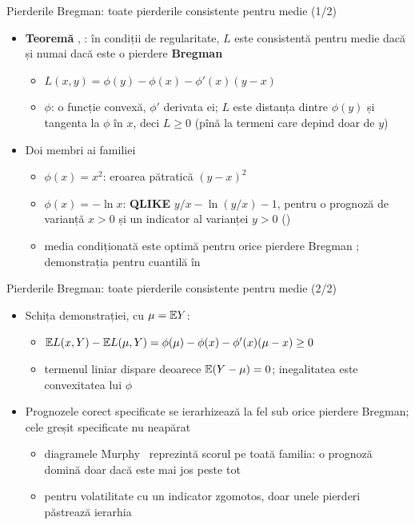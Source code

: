 \begin{frame}{Pierderile Bregman: toate pierderile consistente pentru medie (1/2)}
\itemsize{\small}
\begin{itemize}
    \item \textbf{Teoremă} , : în condiții de regularitate, $L$ este consistentă pentru medie dacă și numai dacă este o pierdere \textbf{Bregman}
    \begin{itemize}
        \item $L(x, y) = \phi(y) - \phi(x) - \phi'(x)(y - x)$
        \item $\phi$: o funcție convexă, $\phi'$ derivata ei; $L$ este distanța dintre $\phi(y)$ și tangenta la $\phi$ în $x$, deci $L \ge 0$ (pînă la termeni care depind doar de $y$)
    \end{itemize}
    \item Doi membri ai familiei
    \begin{itemize}
        \item $\phi(x) = x^2$: eroarea pătratică $(y - x)^2$
        \item $\phi(x) = -\ln x$: \textbf{QLIKE} $y/x - \ln(y/x) - 1$, pentru o prognoză de varianță $x > 0$ și un indicator al varianței $y > 0$ ()
        \item media condiționată este optimă pentru orice pierdere Bregman ; demonstrația pentru cuantilă în 
    \end{itemize}
\end{itemize}
\end{frame}

\begin{frame}{Pierderile Bregman: toate pierderile consistente pentru medie (2/2)}
\itemsize{\small}
\begin{itemize}
    \item Schița demonstrației, cu $\mu = \mathbb{E} Y$:
    \begin{itemize}
        \item $\mathbb{E} L(x, Y) - \mathbb{E} L(\mu, Y) = \phi(\mu) - \phi(x) - \phi'(x)(\mu - x) \ge 0$
        \item termenul liniar dispare deoarece $\mathbb{E}(Y - \mu) = 0$; inegalitatea este convexitatea lui $\phi$
    \end{itemize}
    \item Prognozele corect specificate se ierarhizează la fel sub orice pierdere Bregman; cele greșit specificate nu neapărat 
    \begin{itemize}
        \item diagramele Murphy \ reprezintă scorul pe toată familia: o prognoză domină doar dacă este mai jos peste tot
        \item pentru volatilitate cu un indicator zgomotos, doar unele pierderi păstrează ierarhia 
    \end{itemize}
\end{itemize}
\end{frame}

